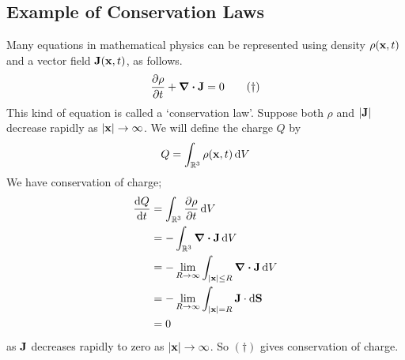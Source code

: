 \subsection{Example of Conservation Laws}
Many equations in mathematical physics can be represented using density \(\rho(\vb x, t)\) and a vector field \(\vb J(\vb x, t)\), as follows.
\begin{equation}
	\pdv{\rho}{t} + \div{\vb J} = 0 \tag{\(\dagger\)}
\end{equation}
This kind of equation is called a `conservation law'. Suppose both \(\rho\) and \(\abs{\vb J}\) decrease rapidly as \(\abs{\vb x} \to \infty\). We will define the charge \(Q\) by
\[ Q = \int_{\mathbb R^3} \rho(\vb x, t) \dd{V} \]
We have conservation of charge;
\begin{align*}
	\dv{Q}{t} & = \int_{\mathbb R^3} \pdv{\rho}{t} \dd{V}                            \\
	          & = -\int_{\mathbb R^3} \div{\vb J} \dd{V}                             \\
	          & = -\lim_{R \to \infty} \int_{\abs{\vb x} \leq R} \div{\vb J} \dd{V}  \\
	          & = -\lim_{R \to \infty} \int_{\abs{\vb x} = R} \vb J \cdot \dd{\vb S} \\
	          & = 0                                                                  \\
\end{align*}
as \(\vb J\) decreases rapidly to zero as \(\abs{\vb x} \to \infty\). So \((\dagger)\) gives conservation of charge.
